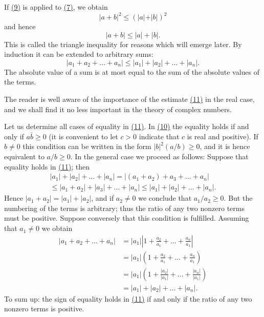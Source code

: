 If \hyperref[eq:1.9]{(9)} is applied to \hyperref[eq:1.7]{(7)}, we obtain
\begin{equation*}
\vert a + b \vert^ {2} \leq (\vert a \vert + \vert b \vert) ^ {2}
\end{equation*}
and hence
\begin{equation*}
| a + b | \leq | a | + | b |.\tag{10}\label{eq:1.10}
\end{equation*}
This is called the triangle inequality for reasons which will emerge later. By induction it can be extended to arbitrary sums:
\begin{equation*}
\left| a _ {1} + a _ {2} + \dots + a _ {n} \right| \leq \left| a _ {1} \right| + \left| a _ {2} \right| + \dots + \left| a _ {n} \right|.\tag{11}\label{eq:1.11}
\end{equation*}
The absolute value of a sum is at most equal to the sum of the absolute values of the terms.

The reader is well aware of the importance of the estimate \hyperref[eq:1.11]{(11)} in the real case, and we shall find it no less important in the theory of complex numbers.

Let us determine all cases of equality in \hyperref[eq:1.11]{(11)}. In \hyperref[eq:1.10]{(10)} the equality holds if and only if $a\bar{b} \geq 0$ (it is convenient to let $c > 0$ indicate that $c$ is real and positive). If $b \neq 0$ this condition can be written in the form $|b|^2(a/b) \geq 0$, and it is hence equivalent to $a/b \geq 0$. In the general
case we proceed as follows: Suppose that equality holds in \hyperref[eq:1.11]{(11)}; then
\begin{equation*}
\begin{array}{c} | a _ {1} | + | a _ {2} | + \dots + | a _ {n} | = | (a _ {1} + a _ {2}) + a _ {3} + \dots + a _ {n} | \\ \leq | a _ {1} + a _ {2} | + | a _ {3} | + \dots + | a _ {n} | \leq | a _ {1} | + | a _ {2} | + \dots + | a _ {n} |. \end{array}
\end{equation*}
Hence $|a_1 + a_2| = |a_1| + |a_2|$, and if $a_2 \neq 0$ we conclude that $a_1 / a_2 \geq 0$. But the numbering of the terms is arbitrary; thus the ratio of any two nonzero terms must be positive. Suppose conversely that this condition is fulfilled. Assuming that $a_1 \neq 0$ we obtain
\begin{equation*}
\begin{aligned}
|a_1+a_2+\dots+a_n|&=|a_1|\left|1+\frac{a_2}{a_1}+\dots+\frac{a_n}{a_1}\right|\\
&=|a_1|\left(1+\frac{a_2}{a_1}+\dots+\frac{a_n}{a_1}\right)\\
&=|a_1|\left(1+\frac{|a_2|}{|a_1|}+\dots+\frac{|a_n|}{|a_1|}\right)\\
&=|a_1|+|a_2|+\dots+|a_n|.
\end{aligned}
\end{equation*}
To sum up: the sign of equality holds in \hyperref[eq:1.11]{(11)} if and only if the ratio of any two nonzero terms is positive.

